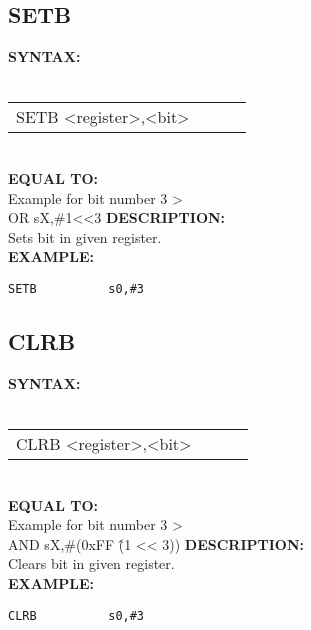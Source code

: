 {                \subsection{SETB}
                \textbf{SYNTAX:}\\
                \\ {
                    \texttt{}
                    \begin{tabular}[h!]{llll}
                            { \color{highlight_instruction} SETB    } { \color{highlight_symbol} <register>,<bit> }
                            { \color{highlight_comment}  }\\
                    \end{tabular}
                    }\\
                    \textbf{EQUAL TO:}\\
                    Example for bit number 3 >\\
                    { \color{highlight_instruction} OR    } { \color{highlight_symbol}      sX,\#1<<3 }
                \textbf{DESCRIPTION:}\\
                Sets bit in given register.\\
                \textbf{EXAMPLE:}\\
                        \begin{code}[h!]
                            {\color{highlight_symbol}\verb'SETB          s0,#3' }\\
                        \end{code}

                \subsection{CLRB}
                \textbf{SYNTAX:}\\
                \\ {
                    \texttt{}
                    \begin{tabular}[h!]{llll}
                            { \color{highlight_instruction} CLRB    } { \color{highlight_symbol} <register>,<bit> }
                            { \color{highlight_comment}  }\\
                    \end{tabular}
                    }\\
                    \textbf{EQUAL TO:}\\
                    Example for bit number 3 >\\
                    { \color{highlight_instruction} AND    } { \color{highlight_symbol}    sX,\#(0xFF \^ (1 << 3)) }
                \textbf{DESCRIPTION:}\\
                Clears bit in given register.\\
                \textbf{EXAMPLE:}\\
                        \begin{code}[h!]
                            {\color{highlight_symbol}\verb'CLRB          s0,#3' }\\
                        \end{code}

}
